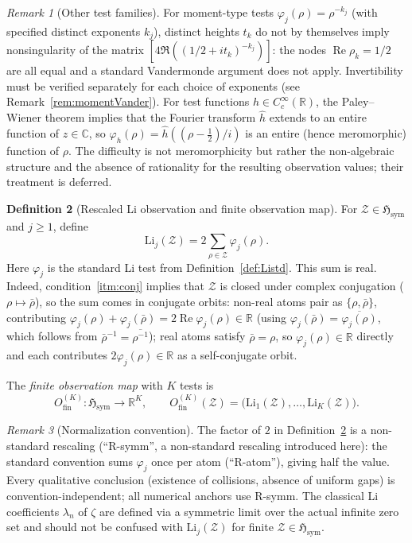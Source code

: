 \documentclass[12pt]{amsart}
\theoremstyle{definition}
\newtheorem{definition}{Definition}[section]
\theoremstyle{remark}
\newtheorem{remark}[definition]{Remark}
\theoremstyle{plain}
\newcommand{\Hsym}{\mathfrak{H}_{\mathrm{sym}}}
\newcommand{\Li}{\mathrm{Li}}
\newcommand{\Ofinite}{O_{\mathrm{fin}}}
\newcommand{\re}{\operatorname{Re}}
\newcommand{\CC}{\mathbb{C}}
\newcommand{\RR}{\mathbb{R}}
\begin{document}
\begin{remark}[Other test families]
For moment-type tests $\varphi_j(\rho)=\rho^{-k_j}$ (with specified distinct
exponents $k_j$), distinct heights $t_k$ do not by themselves imply
nonsingularity of the matrix $[4\Re((1/2+it_k)^{-k_j})]$: the nodes
$\re\rho_k = 1/2$ are all equal and a standard Vandermonde argument
does not apply.  Invertibility must be verified separately for each
choice of exponents (see Remark~\ref{rem:momentVander}).
For test functions $h\in C_c^\infty(\RR)$, the Paley--Wiener theorem
implies that the Fourier transform $\hat h$ extends to an entire function
of $z\in\CC$, so $\varphi_h(\rho)=\hat h((\rho-\tfrac12)/i)$ is an
entire (hence meromorphic) function of $\rho$.  The difficulty is not
meromorphicity but rather the non-algebraic structure and the absence of
rationality for the resulting observation values; their treatment is
deferred.
\end{remark}

\begin{definition}[Rescaled Li observation and finite observation map]
\label{def:Li}
For $\mathcal{Z} \in \Hsym$ and $j \geq 1$, define
\[
  \Li_j(\mathcal{Z}) = 2 \sum_{\rho \in \mathcal{Z}} \varphi_j(\rho).
\]
Here $\varphi_j$ is the standard Li test from Definition~\ref{def:Listd}.
This sum is real.  Indeed, condition~\ref{itm:conj}
implies that $\mathcal{Z}$ is closed under complex conjugation
($\rho\mapsto\bar\rho$), so the sum comes in conjugate orbits:
non-real atoms pair as $\{\rho,\bar\rho\}$, contributing
$\varphi_j(\rho)+\varphi_j(\bar\rho) = 2\re\varphi_j(\rho) \in \RR$
(using $\varphi_j(\bar\rho)=\overline{\varphi_j(\rho)}$, which follows
from $\bar\rho^{-1}=\overline{\rho^{-1}}$);
real atoms satisfy $\bar\rho=\rho$, so $\varphi_j(\rho)\in\RR$ directly
and each contributes $2\varphi_j(\rho)\in\RR$ as a self-conjugate orbit.

The \emph{finite observation map} with $K$ tests is
\[
  \Ofinite^{(K)} : \Hsym \longrightarrow \RR^K, \qquad
  \Ofinite^{(K)}(\mathcal{Z}) = \bigl(\Li_1(\mathcal{Z}), \ldots, \Li_K(\mathcal{Z})\bigr).
\]
\end{definition}

\begin{remark}[Normalization convention]
The factor of $2$ in Definition~\ref{def:Li} is a non-standard rescaling
(``R-symm'', a non-standard rescaling introduced here): the standard
convention sums $\varphi_j$ once per atom (``R-atom''), giving half the
value.  Every qualitative conclusion (existence of collisions, absence of
uniform gaps) is convention-independent; all numerical anchors use R-symm.
The classical Li coefficients $\lambda_n$ of $\zeta$ are defined via a
symmetric limit over the actual infinite zero set and should not be
confused with $\Li_j(\mathcal{Z})$ for finite $\mathcal{Z}\in\Hsym$.
\end{remark}
\end{document}

